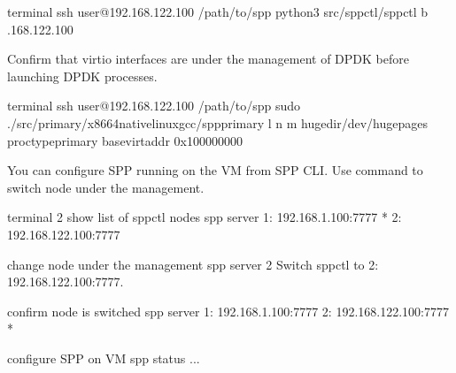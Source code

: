 \documentclass[a4paper,11pt,openany,oneside,english]{sphinxmanual}
\begin{document}
\begin{sphinxVerbatim}[commandchars=\\\{\},formatcom=\footnotesize]
 terminal 
 ssh user@192.168.122.100
  /path/to/spp
 python3 src/spp\PYGZhy{}ctl/spp\PYGZhy{}ctl \PYGZhy{}b .168.122.100
\end{sphinxVerbatim}

Confirm that virtio interfaces are under the management of DPDK before
launching DPDK processes.

\begin{sphinxVerbatim}[commandchars=\\\{\},formatcom=\footnotesize]
 terminal 
 ssh user@192.168.122.100
  /path/to/spp
 sudo ./src/primary/x86\PYGZus{}64\PYGZhy{}native\PYGZhy{}linux\PYGZhy{}gcc/spp\PYGZus{}primary 
    \PYGZhy{}l  \PYGZhy{}n  
    \PYGZhy{}m  
    \PYGZhy{}\PYGZhy{}huge\PYGZhy{}dir/dev/hugepages 
    \PYGZhy{}\PYGZhy{}proc\PYGZhy{}typeprimary 
    \PYGZhy{}\PYGZhy{}base\PYGZhy{}virtaddr 0x100000000
\end{sphinxVerbatim}

You can configure SPP running on the VM from SPP CLI.
Use  command to switch node under the management.

\begin{sphinxVerbatim}[commandchars=\\\{\},formatcom=\footnotesize]
\PYGZsh{} terminal 2
\PYGZsh{} show list of spp\PYGZhy{}ctl nodes
spp \PYGZgt{} server
1: 192.168.1.100:7777 *
2: 192.168.122.100:7777

\PYGZsh{} change node under the management
spp \PYGZgt{} server 2
Switch spp\PYGZhy{}ctl to \PYGZdq{}2: 192.168.122.100:7777\PYGZdq{}.

\PYGZsh{} confirm node is switched
spp \PYGZgt{} server
1: 192.168.1.100:7777
2: 192.168.122.100:7777 *

\PYGZsh{} configure SPP on VM
spp \PYGZgt{} status
...
\end{sphinxVerbatim}
\end{document}

